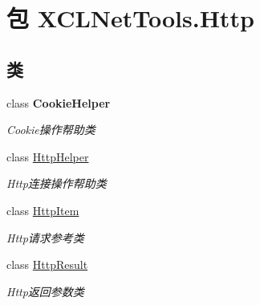 \hypertarget{namespace_x_c_l_net_tools_1_1_http}{\section{包 X\-C\-L\-Net\-Tools.\-Http}
\label{namespace_x_c_l_net_tools_1_1_http}
}
\subsection*{类}
\begin{DoxyCompactItemize}
\item 
class {\bfseries Cookie\-Helper}
\begin{DoxyCompactList}\small\item\em Cookie操作帮助类 \end{DoxyCompactList}\item 
class \hyperlink{class_x_c_l_net_tools_1_1_http_1_1_http_helper}{Http\-Helper}
\begin{DoxyCompactList}\small\item\em Http连接操作帮助类 \end{DoxyCompactList}\item 
class \hyperlink{class_x_c_l_net_tools_1_1_http_1_1_http_item}{Http\-Item}
\begin{DoxyCompactList}\small\item\em Http请求参考类 \end{DoxyCompactList}\item 
class \hyperlink{class_x_c_l_net_tools_1_1_http_1_1_http_result}{Http\-Result}
\begin{DoxyCompactList}\small\item\em Http返回参数类 \end{DoxyCompactList}\end{DoxyCompactItemize}
